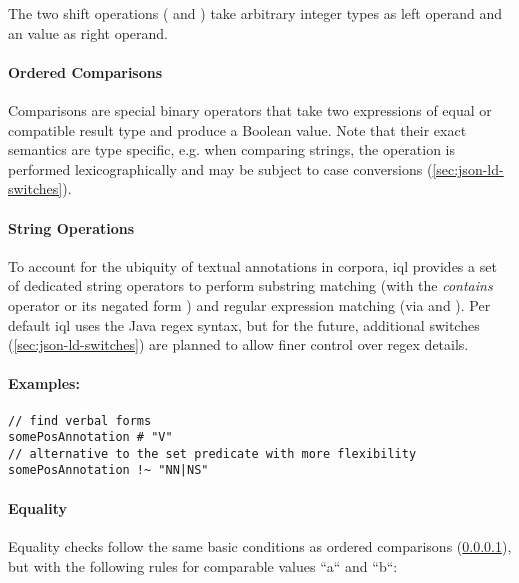 \documentclass[11pt,a4paper]{article}
\begin{document}
The two shift operations (\lit{\textless{}\textless} and \lit{\textgreater{}\textgreater}) take arbitrary integer types as left operand and an  value as right operand.

\paragraph{Ordered Comparisons}
\label{sec:ordered-comparisons}

Comparisons are special binary operators that take two expressions of equal or compatible result type and produce a Boolean value. Note that their exact semantics are type specific, e.g. when comparing strings, the operation is performed lexicographically and may be subject to case conversions (\ref{sec:json-ld-switches}).

\paragraph{String Operations}
\label{sec:string-operations}

To account for the ubiquity of textual annotations in corpora, \ac{iql} provides a set of dedicated string operators to perform substring matching (with the \textit{contains} operator \lit{=\#} or its negated form \lit{!\#}) and regular expression matching (via \lit{=\textasciitilde} and \lit{!\textasciitilde}). Per default \ac{iql} uses the Java regex syntax, but for the future, additional switches (\ref{sec:json-ld-switches}) are planned to allow finer control over regex details.

\paragraph{Examples:}

\begin{Verbatim}[samepage=true]
// find verbal forms
somePosAnnotation # "V"       
// alternative to the set predicate with more flexibility
somePosAnnotation !~ "NN|NS"   
\end{Verbatim}

\paragraph{Equality}
\label{sec:equality}

Equality checks follow the same basic conditions as ordered comparisons (\ref{sec:ordered-comparisons}), but with the following rules for comparable values ``a`` and ``b``:
\end{document}
